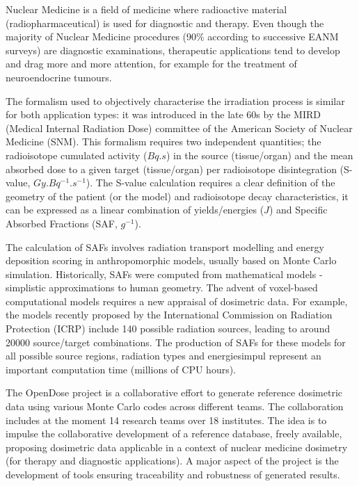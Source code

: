 \begin{task}[
  title=Nuclear Medicine application,
  id=opendose-analysis,
  lead=INSERM,
  PM=24,
  wphases={0-24},
  partners={INSERM}
]
  Nuclear Medicine is a field of medicine where radioactive material
  (radiopharmaceutical) is used for diagnostic and therapy. Even though the
  majority of Nuclear Medicine procedures (90\% according to successive EANM
  surveys) are diagnostic examinations, therapeutic applications tend to
  develop and drag more and more attention, for example for the treatment of
  neuroendocrine tumours.

  The formalism used to objectively characterise the irradiation process is
  similar for both application types: it was introduced in the late 60s by the
  MIRD (Medical Internal Radiation Dose) committee of the American Society of
  Nuclear Medicine (SNM). This formalism requires two independent quantities;
  the radioisotope cumulated activity ($Bq.s$) in the source (tissue/organ) and
  the mean absorbed dose to a given target (tissue/organ) per radioisotope
  disintegration (S-value, $Gy.Bq^{-1}.s^{-1}$). The S-value calculation
  requires a clear definition of the geometry of the patient (or the model) and
  radioisotope decay characteristics, it can be expressed as a linear
  combination of yields/energies ($J$) and Specific Absorbed Fractions (SAF,
  $g^{-1}$).

  The calculation of SAFs involves radiation transport modelling and energy
  deposition scoring in anthropomorphic models, usually based on Monte Carlo
  simulation. Historically, SAFs were computed from mathematical models -
  simplistic approximations to human geometry. The advent of voxel-based
  computational models requires a new appraisal of dosimetric data. For
  example, the models recently proposed by the International Commission on
  Radiation Protection (ICRP) include 140 possible radiation sources, leading
  to around 20000 source/target combinations. The production of SAFs for these
  models for all possible source regions, radiation types and energiesimpul
  represent an important computation time (millions of CPU hours).

  The OpenDose project 
  is a collaborative effort to generate reference
  dosimetric data using various Monte Carlo codes across different teams. The
  collaboration includes at the moment 14 research teams over 18 institutes.
  The idea is to impulse  the collaborative development of a reference database,
  freely available, proposing dosimetric data applicable in a context of
  nuclear medicine dosimetry (for therapy and diagnostic applications). A major
  aspect of the project is the development of tools ensuring traceability and
  robustness of generated results.


\end{task}
